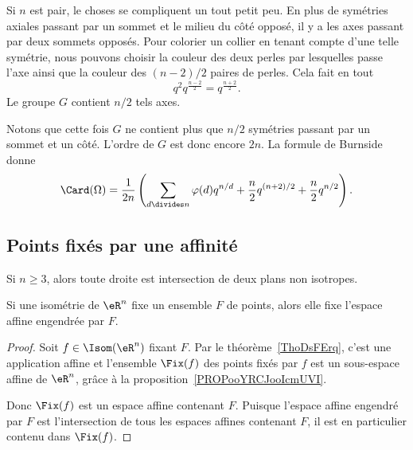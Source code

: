 Si \( n\) est pair, le choses se compliquent un tout petit peu. En plus de symétries axiales passant par un sommet et le milieu du côté opposé, il y a les axes passant par deux sommets opposés. Pour colorier un collier en tenant compte d'une telle symétrie, nous pouvons choisir la couleur des deux perles par lesquelles passe l'axe ainsi que la couleur des \( (n-2)/2\) paires de perles. Cela fait en tout
\begin{equation}
	q^2q^{\frac{ n-2 }{2}}=q^{\frac{ n+2 }{2}}.
\end{equation}
Le groupe \( G\) contient \( n/2\) tels axes.

Notons que cette fois \( G\) ne contient plus que \( n/2\) symétries passant par un sommet et un côté. L'ordre de $G$ est donc encore \( 2n\). La formule de Burnside donne
\begin{equation}
	\Card(\Omega)=\frac{1}{ 2n }\left( \sum_{d\divides n}\varphi(d)q^{n/d}+\frac{ n }{2}q^{(n+2)/2}+\frac{ n }{2}q^{n/2} \right).
\end{equation}

\subsection{Points fixés par une affinité}

\begin{lemma}        \label{LEMooGUEGooTUXRsQ}
	Si \( n\geq 3\), alors toute droite est intersection de deux plans non isotropes.
\end{lemma}

\begin{proposition}      \label{PROPooVEEUooJQmmkN}
	Si une isométrie de \( \eR^n\) fixe un ensemble \( F\) de points, alors elle fixe l'espace affine engendrée par \( F\).
\end{proposition}

\begin{proof}
	Soit \( f\in \Isom(\eR^n)\) fixant \( F\). Par le théorème~\ref{ThoDsFErq}, c'est une application affine et l'ensemble \( \Fix(f)\) des points fixés par \( f\) est un sous-espace affine de \( \eR^n\), grâce à la proposition~\ref{PROPooYRCJooIcmUVI}.

	Donc \( \Fix(f)\) est un espace affine contenant \( F\). Puisque l'espace affine engendré par \( F\) est l'intersection de tous les espaces affines contenant \( F\), il est en particulier contenu dans \( \Fix(f)\).
\end{proof}

